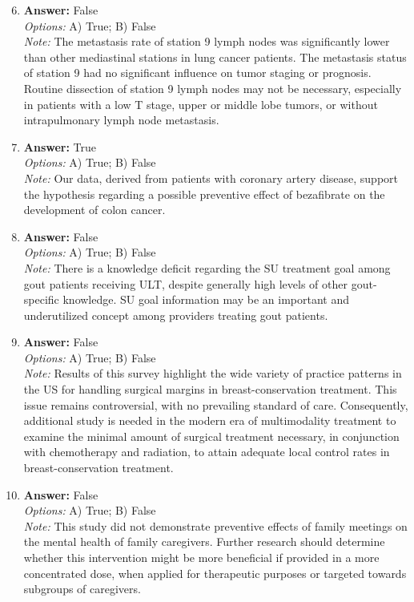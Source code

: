 \documentclass[12pt]{article}
\begin{document}
\begin{enumerate}[label=\arabic*.]
\setcounter{enumi}{5}
\item \textbf{Answer:} False
\\ \textit{Options:} A) True; B) False
\\ \textit{Note:} The metastasis rate of station 9 lymph nodes was significantly lower than other mediastinal stations in lung cancer patients. The metastasis status of station 9 had no significant influence on tumor staging or prognosis. Routine dissection of station 9 lymph nodes may not be necessary, especially in patients with a low T stage, upper or middle lobe tumors, or without intrapulmonary lymph node metastasis.
\item \textbf{Answer:} True
\\ \textit{Options:} A) True; B) False
\\ \textit{Note:} Our data, derived from patients with coronary artery disease, support the hypothesis regarding a possible preventive effect of bezafibrate on the development of colon cancer.
\item \textbf{Answer:} False
\\ \textit{Options:} A) True; B) False
\\ \textit{Note:} There is a knowledge deficit regarding the SU treatment goal among gout patients receiving ULT, despite generally high levels of other gout-specific knowledge. SU goal information may be an important and underutilized concept among providers treating gout patients.
\item \textbf{Answer:} False
\\ \textit{Options:} A) True; B) False
\\ \textit{Note:} Results of this survey highlight the wide variety of practice patterns in the US for handling surgical margins in breast-conservation treatment. This issue remains controversial, with no prevailing standard of care. Consequently, additional study is needed in the modern era of multimodality treatment to examine the minimal amount of surgical treatment necessary, in conjunction with chemotherapy and radiation, to attain adequate local control rates in breast-conservation treatment.
\item \textbf{Answer:} False
\\ \textit{Options:} A) True; B) False
\\ \textit{Note:} This study did not demonstrate preventive effects of family meetings on the mental health of family caregivers. Further research should determine whether this intervention might be more beneficial if provided in a more concentrated dose, when applied for therapeutic purposes or targeted towards subgroups of caregivers.
\end{enumerate}
\end{document}
